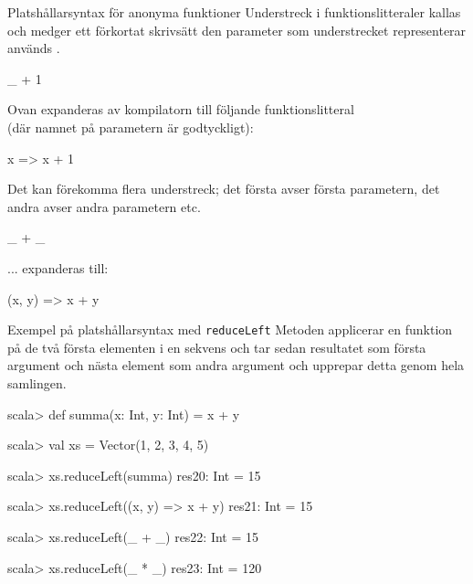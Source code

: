 \begin{Slide}{Platshållarsyntax för anonyma funktioner}\SlideFontSmall
Understreck i funktionslitteraler kallas   och medger ett förkortat skrivsätt  den parameter som understrecket representerar används .
\begin{Code}[basicstyle=\ttfamily\fontsize{10}{12}\selectfont]
_ + 1
\end{Code}
Ovan expanderas av kompilatorn till följande funktionslitteral \\(där namnet på parametern är godtyckligt):
\begin{Code}[basicstyle=\ttfamily\fontsize{10}{12}\selectfont]
x => x + 1
\end{Code}
\pause
Det kan förekomma flera understreck; det första avser första parametern, det andra avser andra parametern etc.
\begin{Code}[basicstyle=\ttfamily\fontsize{10}{12}\selectfont]
_ + _
\end{Code}
\pause
... expanderas till:
\begin{Code}[basicstyle=\ttfamily\fontsize{10}{12}\selectfont]
(x, y) => x + y
\end{Code}
\end{Slide}


\begin{Slide}{Exempel på platshållarsyntax med \texttt{reduceLeft}}\SlideFontSmall
Metoden  applicerar en funktion på de två första elementen i en sekvens och tar sedan resultatet som första argument och nästa element som andra argument och upprepar detta genom hela samlingen.
\begin{REPL}
scala> def summa(x: Int, y: Int) = x + y

scala> val xs = Vector(1, 2, 3, 4, 5)

scala> xs.reduceLeft(summa)
res20: Int = 15

scala> xs.reduceLeft((x, y) => x + y)
res21: Int = 15

scala> xs.reduceLeft(_ + _)
res22: Int = 15

scala> xs.reduceLeft(_ * _)
res23: Int = 120
\end{REPL}
\end{Slide}


